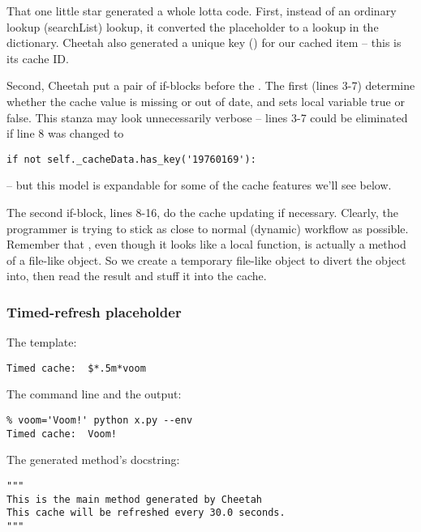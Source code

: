 That one little star generated a whole lotta code.  First, instead of an 
ordinary  lookup (searchList) lookup, it converted the
placeholder to a lookup in the  dictionary.  Cheetah also
generated a unique key () for our cached item -- this is its
cache ID.

Second, Cheetah put a pair of if-blocks before the .  The first
(lines 3-7) determine whether the cache value is missing or out of date, and
sets local variable  true or false.
This stanza may look unnecessarily verbose -- lines 3-7 could be eliminated if
line 8 was changed to
\begin{verbatim}
if not self._cacheData.has_key('19760169'):
\end{verbatim}
-- but this model is expandable for some of the cache features we'll see below.

The second if-block, lines 8-16, do the cache updating if necessary.
Clearly, the programmer is trying to stick as close to normal (dynamic)
workflow as possible.  Remember that , even though it looks like a
local function, is actually a method of a file-like object.  So we create a
temporary file-like object to divert the  object into, then read
the result and stuff it into the cache.

\subsubsection{Timed-refresh placeholder}
\label{output.cache.timed}

The template:
\begin{verbatim}
Timed cache:  $*.5m*voom
\end{verbatim}

The command line and the output:
\begin{verbatim}
% voom='Voom!' python x.py --env
Timed cache:  Voom!
\end{verbatim}

The generated method's docstring:
\begin{verbatim}
"""
This is the main method generated by Cheetah
This cache will be refreshed every 30.0 seconds.
"""
\end{verbatim}

